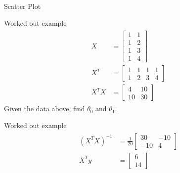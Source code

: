 \documentclass{beamer}
\begin{document}
\begin{frame}{Scatter Plot}

\end{frame}

\begin{frame}{Worked out example}
\begin{align}
\begin{split}
X &= \begin{bmatrix}
1 & 1\\
1 & 2\\
1 & 3 \\
1 & 4
\end{bmatrix}\\
X^{T} &= \begin{bmatrix}
1&1&1&1\\
1&2&3&4
\end{bmatrix}\\
X^{T}X &= \begin{bmatrix}
4 &10\\10&30
\end{bmatrix}
\end{split}
\end{align}
Given the data above, find $\theta_{0}$ and $\theta_{1}$.
\end{frame}


\begin{frame}{Worked out example}
\begin{align}
\begin{split}
(X^{T}X)^{-1} &= \frac{1}{20} \begin{bmatrix}
30 & -10\\
-10& 4
\end{bmatrix}\\
X^{T}y &= \begin{bmatrix}
6\\
14
\end{bmatrix}
\end{split}
\end{align}
\end{frame}
\end{document}
